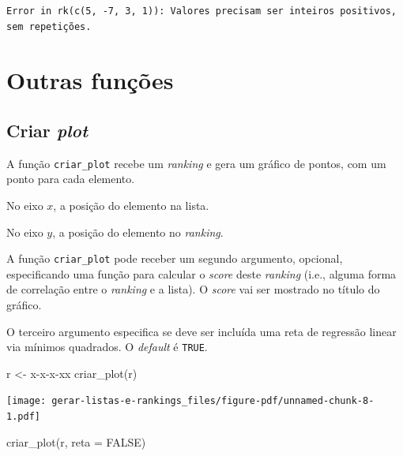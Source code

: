 \documentclass[
  letterpaper,
  DIV=11,
  numbers=noendperiod]{scrreprt}
\newenvironment{Shaded}{\begin{snugshade}}{\end{snugshade}}
\newcommand{\AttributeTok}[1]{\textcolor[rgb]{0.40,0.45,0.13}{#1}}
\newcommand{\ConstantTok}[1]{\textcolor[rgb]{0.56,0.35,0.01}{#1}}
\newcommand{\FunctionTok}[1]{\textcolor[rgb]{0.28,0.35,0.67}{#1}}
\newcommand{\NormalTok}[1]{\textcolor[rgb]{0.00,0.23,0.31}{#1}}
\newcommand{\OtherTok}[1]{\textcolor[rgb]{0.00,0.23,0.31}{#1}}
\newcommand{\StringTok}[1]{\textcolor[rgb]{0.13,0.47,0.30}{#1}}
\begin{document}
\begin{verbatim}
Error in rk(c(5, -7, 3, 1)): Valores precisam ser inteiros positivos, sem repetições.
\end{verbatim}

\section{Outras funções}\label{outras-funuxe7uxf5es}

\subsection{\texorpdfstring{Criar
\emph{plot}}{Criar plot}}\label{criar-plot}

A função \texttt{criar\_plot} recebe um \emph{ranking} e gera um gráfico
de pontos, com um ponto para cada elemento.

No eixo $x$, a posição do elemento na lista.

No eixo $y$, a posição do elemento no \emph{ranking}.

A função \texttt{criar\_plot} pode receber um segundo argumento,
opcional, especificando uma função para calcular o \emph{score} deste
\emph{ranking} (i.e., alguma forma de correlação entre o \emph{ranking}
e a lista). O \emph{score} vai ser mostrado no título do gráfico.

O terceiro argumento especifica se deve ser incluída uma reta de
regressão linear via mínimos quadrados. O \emph{default} é
\texttt{TRUE}.

\begin{Shaded}
\begin{Highlighting}[]
\NormalTok{r }\OtherTok{\textless{}{-}} \StringTok{\textquotesingle{}x{-}x{-}x{-}xx\textquotesingle{}}
\FunctionTok{criar\_plot}\NormalTok{(r)}
\end{Highlighting}
\end{Shaded}

\begin{center}
\texttt{[image: gerar-listas-e-rankings\_files/figure-pdf/unnamed-chunk-8-1.pdf]}
\end{center}

\begin{Shaded}
\begin{Highlighting}[]
\FunctionTok{criar\_plot}\NormalTok{(r, }\AttributeTok{reta =} \ConstantTok{FALSE}\NormalTok{)}
\end{Highlighting}
\end{Shaded}
\end{document}
